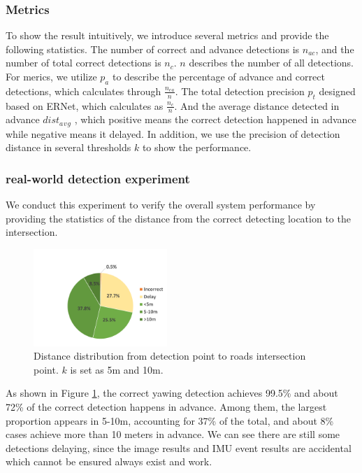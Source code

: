 \documentclass[journal]{IEEEtran}
\begin{document}
\subsubsection{Metrics}
To show the result intuitively, we introduce several metrics and provide the following statistics. The number of correct and advance detections is $n_{ac}$, and the number of total correct detections is $n_c$. $n$ describes the number of all detections.
For merics, we utilize $p_a$ to describe the percentage of advance and correct detections, which calculates through $\frac{n_c{}_a}{n}$. The total detection precision $p_t$ designed based on ERNet\cite{zhang2020elevated}, which calculates as $\frac{n_c}{n}$. And the average distance detected in advance $dist_a{}_v{}_g$ , which positive means the correct detection happened in advance while negative means it delayed. In addition, we use the precision of detection distance in several thresholds $k$ to show the performance.

\subsubsection{real-world detection experiment}
We conduct this experiment to verify the overall system performance by providing the statistics of the distance from the correct detecting location to the intersection. 

\begin{figure}[htbp]
    \centerline{\includegraphics[width=0.45\textwidth]{fig/pie_chart.pdf}}
    \caption{Distance distribution from detection point to roads intersection point. $k$ is set as 5m and 10m.}
    \label{fig:pie_chart}
\end{figure}

As shown in Figure \ref{fig:pie_chart}, the correct yawing detection achieves 99.5\% and about 72\% of the correct detection happens in advance. 
Among them, the largest proportion appears in 5-10m, accounting for 37\% of the total, and about 8\% cases achieve more than 10 meters in advance.
We can see there are still some detections delaying, since the image results and IMU event results are accidental which cannot be ensured always exist and work. 
\end{document}
